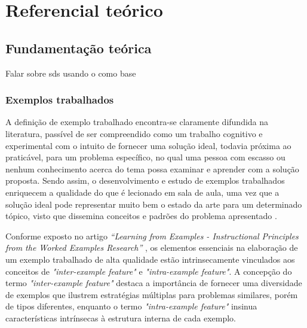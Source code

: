 \chapter{Referencial teórico}
\label{cap:referencialTeorico}


\section{Fundamentação teórica}
\label{section:background}
Falar sobre \gls{sds} usando o \cite{DistributedSystemsCoulouris} como base

\subsection{Exemplos trabalhados}

A definição de exemplo trabalhado encontra-se claramente difundida na literatura, passível de ser compreendido como um trabalho cognitivo e experimental com o intuito de fornecer uma solução ideal, todavia próxima ao praticável, para um problema específico, no qual uma pessoa com escasso ou nenhum conhecimento acerca do tema possa examinar e aprender com a solução proposta. Sendo assim, o desenvolvimento e estudo de exemplos trabalhados enriquecem a qualidade do que é lecionado em sala de aula, uma vez que a solução ideal pode representar muito bem o estado da arte para um determinado tópico, visto que dissemina conceitos e padrões do problema apresentado \cite{Robert.Atkinson-etal:2000}.

Conforme exposto no artigo \textit{``Learning from Examples - Instructional Principles from the Worked Examples Research''} \cite{Robert.Atkinson-etal:2000}, os elementos essenciais na elaboração de um exemplo trabalhado de alta qualidade estão intrinsecamente vinculados aos conceitos de \textit{"inter-example feature"} e \textit{"intra-example feature"}. A concepção do termo \textit{"inter-example feature"} destaca a importância de fornecer uma diversidade de exemplos que ilustrem estratégias múltiplas para problemas similares, porém de tipos diferentes, enquanto o termo \textit{"intra-example feature"} insinua características intrínsecas à estrutura interna de cada exemplo. 

